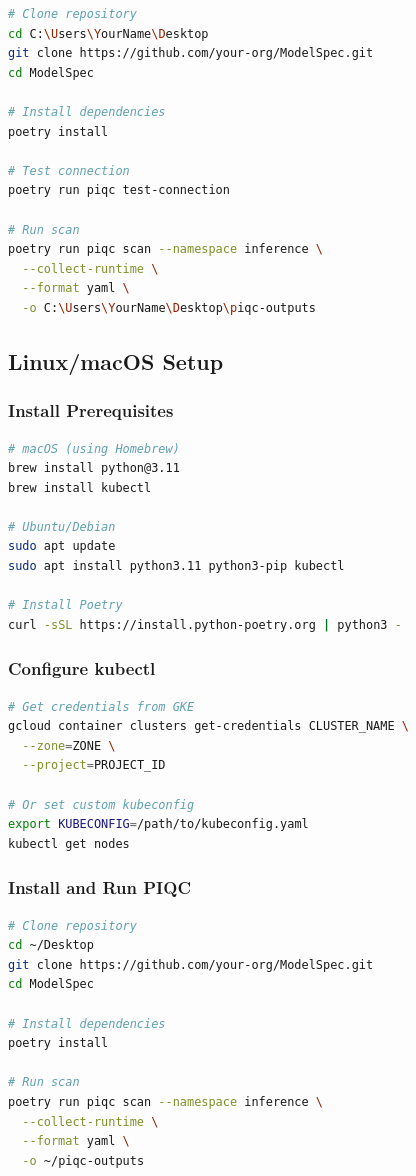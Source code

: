 \documentclass[11pt,a4paper]{article}
\begin{document}
\begin{lstlisting}[language=bash]
# Clone repository
cd C:\Users\YourName\Desktop
git clone https://github.com/your-org/ModelSpec.git
cd ModelSpec

# Install dependencies
poetry install

# Test connection
poetry run piqc test-connection

# Run scan
poetry run piqc scan --namespace inference \
  --collect-runtime \
  --format yaml \
  -o C:\Users\YourName\Desktop\piqc-outputs
\end{lstlisting}

\subsection{Linux/macOS Setup}

\subsubsection{Install Prerequisites}

\begin{lstlisting}[language=bash]
# macOS (using Homebrew)
brew install python@3.11
brew install kubectl

# Ubuntu/Debian
sudo apt update
sudo apt install python3.11 python3-pip kubectl

# Install Poetry
curl -sSL https://install.python-poetry.org | python3 -
\end{lstlisting}

\subsubsection{Configure kubectl}

\begin{lstlisting}[language=bash]
# Get credentials from GKE
gcloud container clusters get-credentials CLUSTER_NAME \
  --zone=ZONE \
  --project=PROJECT_ID

# Or set custom kubeconfig
export KUBECONFIG=/path/to/kubeconfig.yaml
kubectl get nodes
\end{lstlisting}

\subsubsection{Install and Run PIQC}

\begin{lstlisting}[language=bash]
# Clone repository
cd ~/Desktop
git clone https://github.com/your-org/ModelSpec.git
cd ModelSpec

# Install dependencies
poetry install

# Run scan
poetry run piqc scan --namespace inference \
  --collect-runtime \
  --format yaml \
  -o ~/piqc-outputs
\end{lstlisting}
\end{document}
